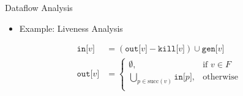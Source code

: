 
\begin{frame}[fragile]{Dataflow Analysis}

\begin{itemize}
    \item Example: Liveness Analysis
\end{itemize}

\begin{equation}\label{eq:liveness}
\begin{split}
	\texttt{in[} v \texttt{]} &= (\texttt{out[} v \texttt{]} - \texttt{kill[} v \texttt{]}) \cup \texttt{gen[} v \texttt{]} \\
	\texttt{out[} v \texttt{]} &= 
	\begin{cases}
	  \emptyset,& \text{if } v \in F \\
	  \bigcup_{p \in \text{succ}(v)}\texttt{in[}p\texttt{]} ,& \text{otherwise} \\
	\end{cases}
\end{split}
\end{equation}
\end{frame}

